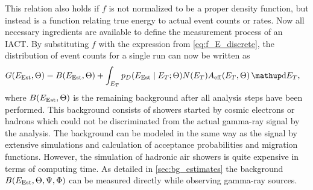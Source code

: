 This relation also holds if $f$ is not normalized to be a proper density function, but instead is a function relating true energy to 
actual event counts or rates. 
Now all necessary ingredients are available to define the measurement process of an IACT.
By substituting $f$ with the expression from \cref{eq:f_E_discrete}, the distribution of event counts for a single run can now be written as
\begin{align}
  \label{eq:iact_measure_continuous}
G(\eest, \Theta) &=  B(\eest,  \Theta) + \int_{\etrue} p_D(\eest \mid \etrue; \Theta) N(\etrue)A_{\mathrm{eff}}(\etrue, \Theta) \diff{\etrue},
\end{align}
where $B(E_\text{Est}, \Theta)$ is the remaining background after all analysis steps have been performed. 
This background consists of showers started by cosmic electrons or hadrons which could not be discriminated from the actual gamma-ray signal by the analysis.
The background can be modeled in the same way as the signal by extensive simulations and calculation of acceptance probabilities and 
migration functions. However, the simulation of hadronic air showers is quite expensive in terms of computing time. 
As detailed in \cref{sec:bg_estimates} the background $B(E_\text{Est}, \Theta, \Psi, \Phi)$ can be measured directly while observing gamma-ray sources.

